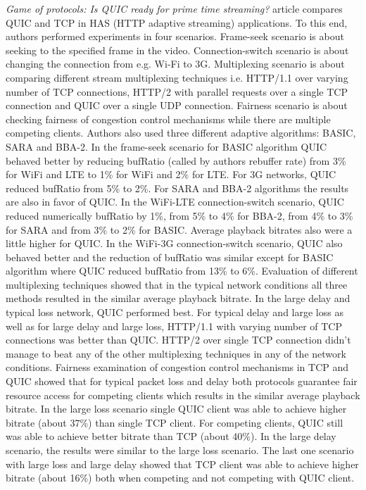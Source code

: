 \textit{Game of protocols: Is QUIC ready for prime time streaming?} article \cite{game-of-protocols} compares QUIC and TCP in HAS (HTTP adaptive streaming) applications.
To this end, authors performed experiments in four scenarios.
Frame-seek scenario is about seeking to the specified frame in the video.
Connection-switch scenario is about changing the connection from e.g. Wi-Fi to 3G.
Multiplexing scenario is about comparing different stream multiplexing techniques i.e. HTTP/1.1 over varying number of TCP connections, HTTP/2 with parallel requests over a single TCP connection and QUIC over a single UDP connection.
Fairness scenario is about checking fairness of congestion control mechanisms while there are multiple competing clients.
Authors also used three different adaptive algorithms: BASIC, SARA and BBA-2.
In the frame-seek scenario for BASIC algorithm QUIC behaved better by reducing bufRatio (called by authors rebuffer rate) from 3\% for WiFi and LTE to 1\% for WiFi and 2\% for LTE. 
For 3G networks, QUIC reduced bufRatio from 5\% to 2\%.
For SARA and BBA-2 algorithms the results are also in favor of QUIC.
In the WiFi-LTE connection-switch scenario, QUIC reduced numerically bufRatio by 1\%, from 5\% to 4\% for BBA-2, from 4\% to 3\% for SARA and from 3\% to 2\% for BASIC. 
Average playback bitrates also were a little higher for QUIC.
In the WiFi-3G connection-switch scenario, QUIC also behaved better and the reduction of bufRatio was similar except for BASIC algorithm where QUIC reduced bufRatio from 13\% to 6\%.
Evaluation of different multiplexing techniques showed that in the typical network conditions all three methods resulted in the similar average playback bitrate.
In the large delay and typical loss network, QUIC performed best.
For typical delay and large loss as well as for large delay and large loss, HTTP/1.1 with varying number of TCP connections was better than QUIC.
HTTP/2 over single TCP connection didn't manage to beat any of the other multiplexing techniques in any of the network conditions.
Fairness examination of congestion control mechanisms in TCP and QUIC showed that for typical packet loss and delay both protocols guarantee fair resource access for competing clients which results in the similar average playback bitrate.
In the large loss scenario single QUIC client was able to achieve higher bitrate (about 37\%) than single TCP client.
For competing clients, QUIC still was able to achieve better bitrate than TCP (about 40\%).
In the large delay scenario, the results were similar to the large loss scenario.
The last one scenario with large loss and large delay showed that TCP client was able to achieve higher bitrate (about 16\%) both when competing and not competing with QUIC client.
